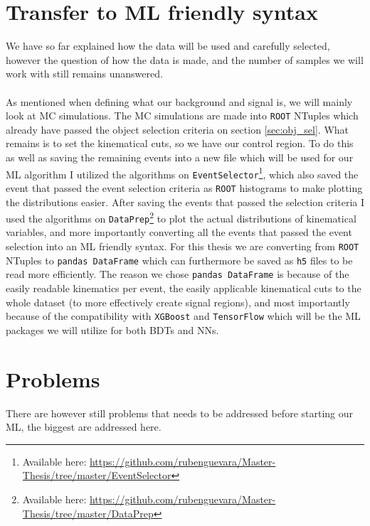 \documentclass[12pt, a4paper]{book}
\begin{document}
\section{Transfer to ML friendly syntax}
We have so far explained how the data will be used and carefully selected, however the question of how the data is made, and the number of samples we will work with still remains unanswered. \\
\\As mentioned when defining what our background and signal is, we will mainly look at MC simulations. The MC simulations are made into \verb|ROOT| \cite{ROOT} NTuples which already have passed the object selection criteria on section \ref{sec:obj_sel}. What remains is to set the kinematical cuts, so we have our control region. 
To do this as well as saving the remaining events into a new file which will be used for our ML algorithm I utilized the algorithms on \verb|EventSelector|\footnote{Available here: \href{https://github.com/rubenguevara/Master-Thesis/tree/master/EventSelector}{https://github.com/rubenguevara/Master-Thesis/tree/master/EventSelector}}, 
which also saved the event that passed the event selection criteria as \verb|ROOT| histograms to make plotting the distributions easier. After saving the events that passed the selection criteria I used the algorithms on \verb|DataPrep|\footnote{Available here: \href{https://github.com/rubenguevara/Master-Thesis/tree/master/DataPrep}{https://github.com/rubenguevara/Master-Thesis/tree/master/DataPrep}} 
to plot the actual distributions of kinematical variables, and more importantly converting all the events that passed the event selection into an ML friendly syntax. For this thesis we are converting from \verb|ROOT| NTuples to \verb|pandas DataFrame| \cite{pd.DataFrame} 
which can furthermore be saved as \verb|h5| files to be read more efficiently. The reason we chose \verb|pandas DataFrame| is because of the easily readable kinematics per event, the easily applicable kinematical cuts to the whole dataset 
(to more effectively create signal regions), and most importantly because of the compatibility with \verb|XGBoost| \cite{XGBoost} and \verb|TensorFlow| \cite{TensorFlow} which will be the ML packages we will utilize for both BDTs and NNs.

\section{Problems}
There are however still problems that needs to be addressed before starting our ML, the biggest are addressed here.
\end{document}
